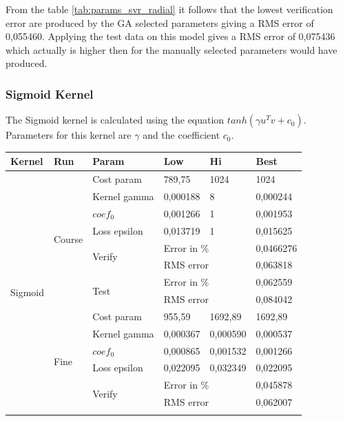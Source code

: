 From the table \ref{tab:params_svr_radial} it follows that the lowest verification error are produced by the GA selected parameters giving a RMS error of 0,055460. Applying the test data on this model gives a RMS error of 0,075436 which actually is higher then for the manually selected parameters would have produced.

\subsubsection{Sigmoid Kernel} \label{sss:performance_sigmoid_svr}
The Sigmoid kernel is calculated using the equation $tanh(\gamma u^{T} v + c_{0})$. Parameters for this kernel are $\gamma$ and the coefficient $c_{0}$.

\begin{table}[H]
\begin{threeparttable}
\begin{tabular}{ | l | l | l | l | l | l | } 
\hline 
Kernel & Run & Param & Low & Hi & Best \\
\hline 
\multirow{24}{*}{Sigmoid} %
& \multirow{8}{*}{Course} & Cost param & 789,75 & 1024 & 1024 \\
& & Kernel gamma & 0,000188 & 8 & 0,000244 \\  
& & $coef_{0}$ & 0,001266 & 1 & 0,001953 \\
& & Loss epsilon & 0,013719 & 1 & 0,015625 \\ 
\cline{3-6}
& & \multirow{2}{*}{Verify} & \multicolumn{2}{l|}{Error in \%} & 0,0466276 \\
& & & \multicolumn{2}{l|}{RMS error} & 0,063818 \\
\cline{3-6}
& & \multirow{2}{*}{Test} & \multicolumn{2}{l|}{Error in \%} & 0,062559 \\
& & & \multicolumn{2}{l|}{RMS error} & 0,084042 \\
\cline{2-6}
& \multirow{8}{*}{Fine} & Cost param & 955,59 & 1692,89 & 1692,89 \\
& & Kernel gamma & 0,000367 & 0,000590 & 0,000537 \\  
& & $coef_{0}$ & 0,000865 & 0,001532 & 0,001266 \\
& & Loss epsilon & 0,022095 & 0,032349 & 0,022095 \\
\cline{3-6}
& & \multirow{2}{*}{Verify} & \multicolumn{2}{l|}{Error in \%} & 0,045878 \\
& & & \multicolumn{2}{l|}{RMS error} & 0,062007 \\
\cline{3-6}

\end{tabular}
\end{threeparttable}
\end{table}
